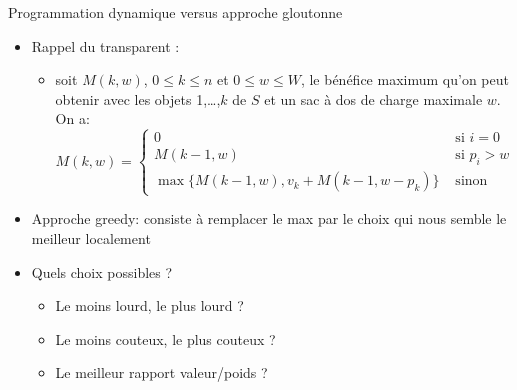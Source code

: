 \begin{frame}{Programmation dynamique versus approche gloutonne}
\begin{itemize}
\item Rappel du transparent \pageref{part6:knapsack}:
\begin{itemize}
\item soit $M(k,w)$, $0\leq k\leq n$ et $0\leq w\leq W$, le bénéfice
  maximum qu'on peut obtenir avec les objets 1,\ldots,$k$ de $S$ et un
  sac à dos de charge maximale $w$. On a:
  {\small \[M(k,w)=\left\{\begin{array}{ll} 0 & \mbox{ si
    }i=0\\ M(k-1,w) & \mbox{ si }
    p_i>w\\ \max\{M(k-1,w),v_k+M(k-1,w-p_k)\} & \mbox{ sinon}
\end{array}
\right.
\]}
\end{itemize}
\item Approche greedy: consiste à remplacer le \alert{max} par le choix qui nous semble le meilleur localement
\item Quels choix possibles ?
\begin{itemize}
\item Le moins lourd, le plus lourd ?
\item Le moins couteux, le plus couteux ?
\item Le meilleur rapport valeur/poids ?
\end{itemize}
\end{itemize}

\end{frame}

